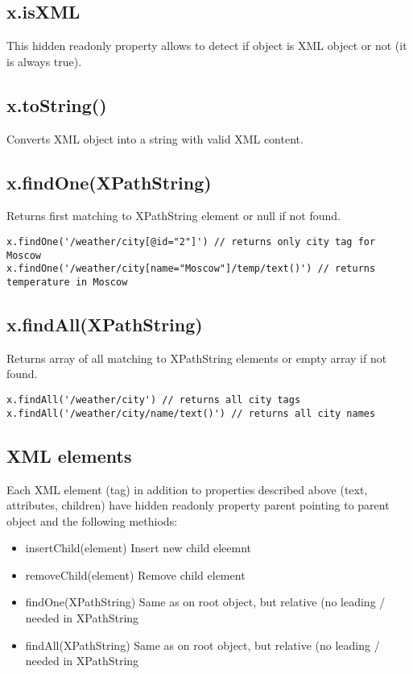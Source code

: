 \subsection{x.isXML}
This hidden readonly property allows to detect if object is XML object or not (it is always true).

\subsection{x.toString()}
Converts XML object into a string with valid XML content.

\subsection{x.findOne(XPathString)}
Returns first matching to XPathString element or null if not found.
\begin{lstlisting}
x.findOne('/weather/city[@id="2"]') // returns only city tag for Moscow
x.findOne('/weather/city[name="Moscow"]/temp/text()') // returns temperature in Moscow
\end{lstlisting}

\subsection{x.findAll(XPathString)}
Returns array of all matching to XPathString elements or empty array if not found.
\begin{lstlisting}
x.findAll('/weather/city') // returns all city tags
x.findAll('/weather/city/name/text()') // returns all city names
\end{lstlisting}

\subsection{XML elements}
Each XML element (tag) in addition to properties described above (text, attributes, children) have hidden readonly property parent pointing to parent object and the following methiods:
\begin{itemize}
\item insertChild(element) Insert new child eleemnt
\item removeChild(element) Remove child element
\item findOne(XPathString) Same as on root object, but relative (no leading / needed in XPathString
\item findAll(XPathString) Same as on root object, but relative (no leading / needed in XPathString
\end{itemize}


